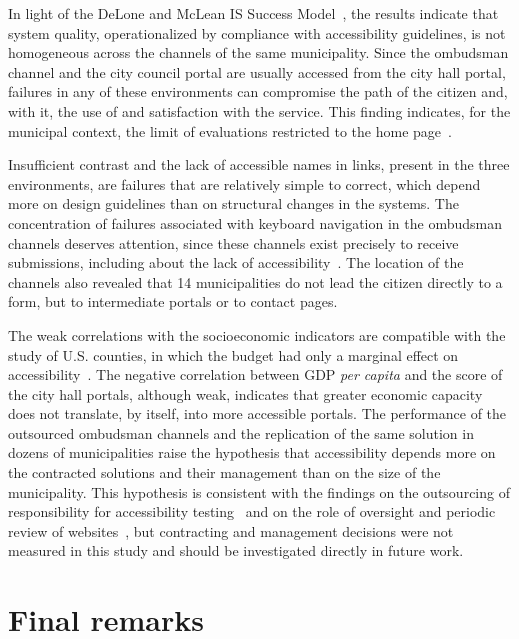 \documentclass[12pt]{article}
\begin{document}
In light of the DeLone and McLean IS Success Model~\cite{delone1992,delone2003}, the results indicate that system quality, operationalized by compliance with accessibility guidelines, is not homogeneous across the channels of the same municipality. Since the ombudsman channel and the city council portal are usually accessed from the city hall portal, failures in any of these environments can compromise the path of the citizen and, with it, the use of and satisfaction with the service. This finding indicates, for the municipal context, the limit of evaluations restricted to the home page~\cite{valtolina2022,eres,franca2025}.

Insufficient contrast and the lack of accessible names in links, present in the three environments, are failures that are relatively simple to correct, which depend more on design guidelines than on structural changes in the systems. The concentration of failures associated with keyboard navigation in the ombudsman channels deserves attention, since these channels exist precisely to receive submissions, including about the lack of accessibility~\cite{lei13460}. The location of the channels also revealed that 14 municipalities do not lead the citizen directly to a form, but to intermediate portals or to contact pages.

The weak correlations with the socioeconomic indicators are compatible with the study of U.S. counties, in which the budget had only a marginal effect on accessibility~\cite{bai2021}. The negative correlation between GDP \textit{per capita} and the score of the city hall portals, although weak, indicates that greater economic capacity does not translate, by itself, into more accessible portals. The performance of the outsourced ombudsman channels and the replication of the same solution in dozens of municipalities raise the hypothesis that accessibility depends more on the contracted solutions and their management than on the size of the municipality. This hypothesis is consistent with the findings on the outsourcing of responsibility for accessibility testing~\cite{nunes2025} and on the role of oversight and periodic review of websites~\cite{frandell2026}, but contracting and management decisions were not measured in this study and should be investigated directly in future work.


\section{Final remarks}
\label{sec:consideracoes}
\end{document}
